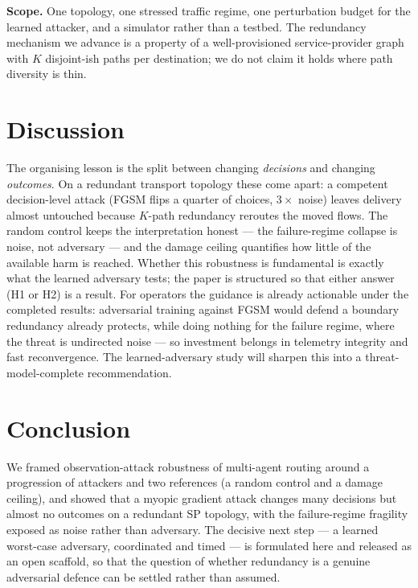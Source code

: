 \documentclass[10pt,journal,comsoc]{IEEEtran}
\begin{document}
\textbf{Scope.} One topology, one stressed traffic regime, one perturbation budget for the
learned attacker, and a simulator rather than a testbed. The redundancy mechanism we
advance is a property of a well-provisioned service-provider graph with $K$ disjoint-ish
paths per destination; we do not claim it holds where path diversity is thin.

\section{Discussion}
\label{sec:discussion}
The organising lesson is the split between changing \emph{decisions} and changing
\emph{outcomes}. On a redundant transport topology these come apart: a competent
decision-level attack (FGSM flips a quarter of choices, $3\times$ noise) leaves
delivery almost untouched because $K$-path redundancy reroutes the moved flows. The
random control keeps the interpretation honest --- the failure-regime collapse is noise,
not adversary --- and the damage ceiling quantifies how little of the available harm is
reached. Whether this robustness is fundamental is exactly what the learned adversary
tests; the paper is structured so that either answer (H1 or H2) is a result. For
operators the guidance is already actionable under the completed results: adversarial
training against FGSM would defend a boundary redundancy already protects, while doing
nothing for the failure regime, where the threat is undirected noise --- so investment
belongs in telemetry integrity and fast reconvergence. The learned-adversary study will
sharpen this into a threat-model-complete recommendation.

\section{Conclusion}
\label{sec:conclusion}
We framed observation-attack robustness of multi-agent routing around a progression of
attackers and two references (a random control and a damage ceiling), and showed that a
myopic gradient attack changes many decisions but almost no outcomes on a redundant SP
topology, with the failure-regime fragility exposed as noise rather than adversary. The
decisive next step --- a learned worst-case adversary, coordinated and timed --- is
formulated here and released as an open scaffold, so that the question of whether
redundancy is a genuine adversarial defence can be settled rather than assumed.
\end{document}
